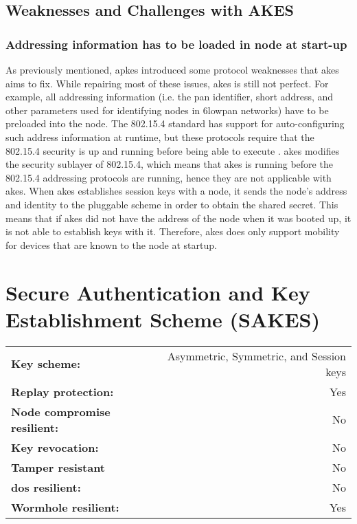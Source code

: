 \subsection{Weaknesses and Challenges with AKES}

\subsubsection{Addressing information has to be loaded in node at start-up}

As previously mentioned, \gls{apkes} introduced some protocol weaknesses that \gls{akes} aims to fix. While repairing most of these issues, \gls{akes} is still not perfect. For example, all addressing information (i.e. the \gls{pan} identifier, short address, and other parameters used for identifying nodes in \gls{6lowpan} networks) have to be preloaded into the node. The 802.15.4 standard has support for auto-configuring such address information at runtime, but these protocols require that the 802.15.4 security is up and running before being able to execute \cite{krentz2015handling}. \gls{akes} modifies the security sublayer of 802.15.4, which means that \gls{akes} is running before the 802.15.4 addressing protocols are running, hence they are not applicable with \gls{akes}. When \gls{akes} establishes session keys with a node, it sends the node's address and identity to the pluggable scheme in order to obtain the shared secret. This means that if \gls{akes} did not have the address of the node when it was booted up, it is not able to establish keys with it. Therefore, \gls{akes} does only support mobility for devices that are known to the node at startup.
 

\section{Secure Authentication and Key Establishment Scheme (SAKES)}
\label{sec:sakes}


\begin{table}[h]
\begin{tabular}{lr}
\textbf{Key scheme:} & Asymmetric, Symmetric, and Session keys  \\
\textbf{Replay protection:}	 & Yes  \\
\textbf{Node compromise resilient:} & No  \\
\textbf{Key revocation:} & No \\
\textbf{Tamper resistant} & No \\
\textbf{\gls{dos} resilient:} & No \\
\textbf{Wormhole resilient:} & Yes \\
\end{tabular}
\end{table}

